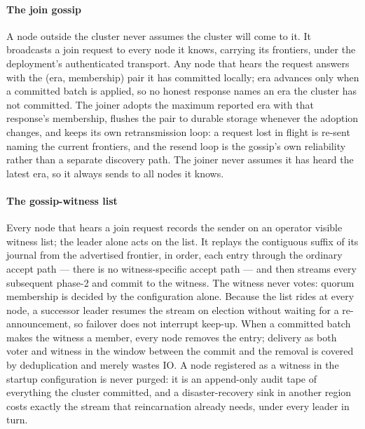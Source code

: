 \documentclass[10pt,journal,letterpaper]{IEEEtran}
\begin{document}
\paragraph{The join gossip}
A node outside the cluster never assumes the cluster will come to it. It
broadcasts a join request to every node it knows, carrying its frontiers,
under the deployment's authenticated transport. Any node that hears the
request answers with the (era, membership) pair it has committed locally;
era advances only when a committed batch is applied, so no honest response
names an era the cluster has not committed. The joiner adopts the maximum
reported era with that response's membership, flushes the pair to durable
storage whenever the adoption changes, and keeps its own retransmission
loop: a request lost in flight is re-sent naming the current frontiers, and
the resend loop is the gossip's own reliability rather than a separate
discovery path. The joiner never assumes it has heard the latest era, so it
always sends to all nodes it knows.

\paragraph{The gossip-witness list}
Every node that hears a join request records the sender on an operator
visible witness list; the leader alone acts on the list. It replays the
contiguous suffix of its journal from the advertised frontier, in order,
each entry through the ordinary accept path --- there is no
witness-specific accept path --- and then streams every subsequent phase-2
and commit to the witness. The witness never votes: quorum membership is
decided by the configuration alone. Because the list rides at every node,
a successor leader resumes the stream on election without waiting for a
re-announcement, so failover does not interrupt keep-up. When a committed
batch makes the witness a member, every node removes the entry; delivery
as both voter and witness in the window between the commit and the removal
is covered by deduplication and merely wastes IO. A node registered as a
witness in the startup configuration is never purged: it is an append-only
audit tape of everything the cluster committed, and a disaster-recovery
sink in another region costs exactly the stream that reincarnation already
needs, under every leader in turn.
\end{document}
